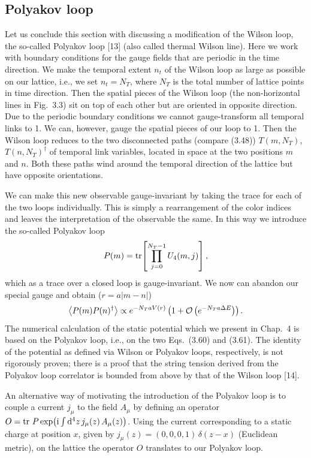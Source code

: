\subsection{Polyakov loop}

Let us conclude this section with discussing a modification of the Wilson loop,
the so-called Polyakov loop [13] (also called thermal Wilson line). Here we
work with boundary conditions for the gauge fields that are periodic in the
time direction. We make the temporal extent $n_t$ of the Wilson loop as large as
possible on our lattice, i.e., we set $n_t = N_T$, where $N_T$ is the total
number of lattice points in time direction. Then the spatial pieces of the
Wilson loop (the non-horizontal lines in Fig.~3.3) sit on top of each other but
are oriented in opposite direction. Due to the periodic boundary conditions we
cannot gauge-transform all temporal links to 1. We can, however, gauge the
spatial pieces of our loop to 1. Then the Wilson loop reduces to the two
disconnected paths (compare (3.48)) $T(m, N_T)$, $T(n, N_T)^\dagger$ of temporal
link variables, located in space at the two positions $m$ and $n$. Both these
paths wind around the temporal direction of the lattice but have opposite
orientations.

We can make this new observable gauge-invariant by taking the trace for each of
the two loops individually. This is simply a rearrangement of the color indices
and leaves the interpretation of the observable the same. In this way we
introduce the so-called Polyakov loop
\begin{equation}
  P(m) = \operatorname{tr}\!\left[\prod_{j=0}^{N_T-1} U_4(m, j)\right] ,
\end{equation}
which as a trace over a closed loop is gauge-invariant. We now can abandon our
special gauge and obtain ($r = a|m - n|$)
\begin{equation}
  \left\langle P(m)P(n)^\dagger \right\rangle \propto e^{-N_T a V(r)}\left(1 + \mathcal{O}\left(e^{-N_T a\Delta E}\right)\right) .
\end{equation}
The numerical calculation of the static potential which we present in Chap.~4
is based on the Polyakov loop, i.e., on the two Eqs.~(3.60) and (3.61). The
identity of the potential as defined via Wilson or Polyakov loops,
respectively, is not rigorously proven; there is a proof that the string tension
derived from the Polyakov loop correlator is bounded from above by that of the
Wilson loop [14].

An alternative way of motivating the introduction of the Polyakov loop is to
couple a current $j_\mu$ to the field $A_\mu$ by defining an operator
$O = \operatorname{tr}\,P\exp\!\big(\mathrm{i}\int \mathrm{d}^4 z\, j_\mu(z)\, A_\mu(z)\big)$. Using the
current corresponding to a static charge at position $x$, given by
$j_\mu(z) = (0, 0, 0, 1)\,\delta(z - x)$ (Euclidean metric), on the lattice the
operator $O$ translates to our Polyakov loop.

